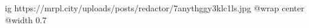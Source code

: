  
 
 
 
 

\ifcmt
  ig https://mrpl.city/uploads/posts/redactor/7anythggy3klc1ls.jpg
  @wrap center
  @width 0.7
\fi
